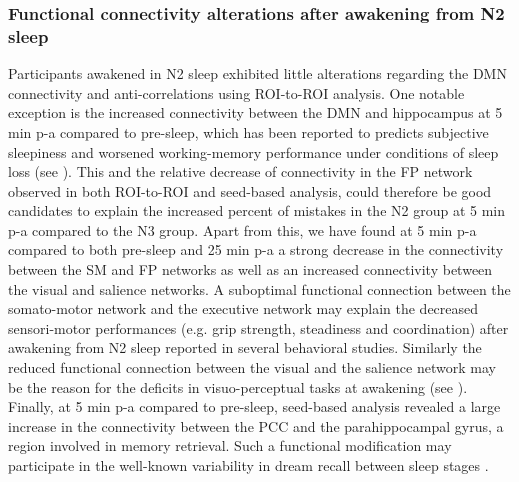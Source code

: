 \subsubsection*{Functional connectivity alterations after awakening from N2 sleep}
Participants awakened in N2 sleep exhibited little alterations regarding the DMN connectivity and anti-correlations using ROI-to-ROI analysis. One notable exception is the increased connectivity between the DMN and hippocampus at 5 min p-a compared to pre-sleep, which has been reported to predicts subjective sleepiness and worsened working-memory performance under conditions of sleep loss (see \citealp{krause_sleep-deprived_2017}). This and the relative decrease of connectivity in the FP network observed in both ROI-to-ROI and seed-based analysis, could therefore be good candidates to explain the increased percent of mistakes in the N2 group at 5 min p-a compared to the N3 group. Apart from this, we have found at 5 min p-a compared to both pre-sleep and 25 min p-a a strong decrease in the connectivity between the SM and FP networks as well as an increased connectivity between the visual and salience networks. A suboptimal functional connection between the somato-motor network and the executive network may explain the decreased sensori-motor performances (e.g. grip strength, steadiness and coordination) after awakening from N2 sleep reported in several behavioral studies. Similarly the reduced functional connection between the visual and the salience network may be the reason for the deficits in visuo-perceptual tasks at awakening (see \citealp{tassi_sleep_2000}). Finally, at 5 min p-a compared to pre-sleep, seed-based analysis revealed a large increase in the connectivity between the PCC and the parahippocampal gyrus, a region involved in memory retrieval. Such a functional modification may participate in the well-known variability in dream recall between sleep stages \citep{nielsen_review_2000, ruby_experimental_2011}.

